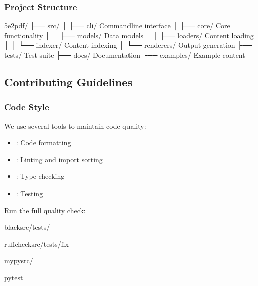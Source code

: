 \documentclass[letterpaper,10pt,english]{sphinxmanual}
\begin{document}
\subsubsection{Project Structure}
\label{\detokenize{developer/contributing:project-structure}}
\begin{sphinxVerbatim}[commandchars=\\\{\}]
5e2pdf/
├── src/
│   ├── cli/                 \PYGZsh{} Command\PYGZhy{}line interface
│   ├── core/                \PYGZsh{} Core functionality
│   │   ├── models/          \PYGZsh{} Data models
│   │   ├── loaders/         \PYGZsh{} Content loading
│   │   └── indexer/         \PYGZsh{} Content indexing
│   └── renderers/           \PYGZsh{} Output generation
├── tests/                   \PYGZsh{} Test suite
├── docs/                    \PYGZsh{} Documentation
└── examples/                \PYGZsh{} Example content
\end{sphinxVerbatim}


\subsection{Contributing Guidelines}
\label{\detokenize{developer/contributing:contributing-guidelines}}

\subsubsection{Code Style}
\label{\detokenize{developer/contributing:code-style}}
\sphinxAtStartPar
We use several tools to maintain code quality:
\begin{itemize}
\item {} 
\sphinxAtStartPar
{}: Code formatting

\item {} 
\sphinxAtStartPar
{}: Linting and import sorting

\item {} 
\sphinxAtStartPar
{}: Type checking

\item {} 
\sphinxAtStartPar
{}: Testing

\end{itemize}

\sphinxAtStartPar
Run the full quality check:

\begin{sphinxVerbatim}[commandchars=\\\{\}]
blacksrc/tests/

ruffchecksrc/tests/\PYGZhy{}\PYGZhy{}fix

mypysrc/

pytest
\end{sphinxVerbatim}
\end{document}

